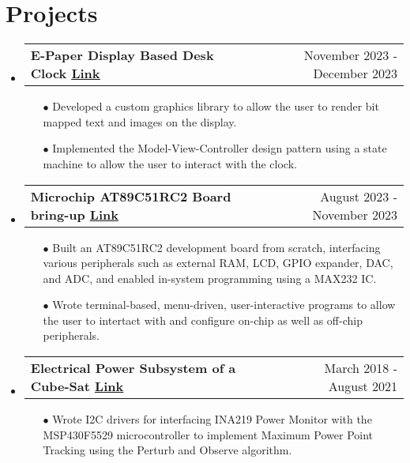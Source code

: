 \documentclass[11pt]{article}
\makeatletter
\newcommand{\resumeSubheadingP}[2]{
  \vspace{-2pt}\item
    \begin{tabular*}{1.0\textwidth}[t]{l@{\extracolsep{\fill}}r}
       \textbf{{\large #1}}&{#2} \\
    \end{tabular*}\vspace{-1pt}
}
\newcommand{\resumeSubHeadingListStart}{\begin{itemize}[leftmargin=0.0in, label={}]}
\newcommand{\resumeSubHeadingListEnd}{\end{itemize}}
\makeatother
\begin{document}
\section{Projects}
  \resumeSubHeadingListStart
    \resumeSubheadingP
    {E-Paper Display Based Desk Clock \href{https://github.com/parthkharade/Eink-DeskClock}{\small{\textbar{ }\underline{Link} }}}{November 2023 - December 2023}
    \begin{itemize}\setlength{\itemsep}{0pt}\setlength{\parskip}{0pt}\vspace{-0.2cm}
            \item[$\bullet$] Developed a custom graphics library  to allow the user to render bit mapped text and images on the display.
            \item[$\bullet$] Implemented the Model-View-Controller design pattern using a state machine to allow the user to interact with the clock.
        \end{itemize}
    \vspace{-0.3cm}
    \resumeSubheadingP
    {Microchip AT89C51RC2 Board bring-up \href{https://drive.google.com/drive/folders/1rbtfpOdMc_ohnfu15VS3bPxNDx-BoWwA?usp=drive_link}{\small{\textbar{ }\underline{Link}}}}{August 2023 - November 2023}
    \begin{itemize}\setlength{\itemsep}{0pt}\setlength{\parskip}{0pt}\vspace{-0.2cm}
            \item[$\bullet$] Built an AT89C51RC2 development board from scratch, interfacing various peripherals such as external RAM, LCD, GPIO expander, DAC, and ADC, and enabled in-system programming using a MAX232 IC.
            \item[$\bullet$] Wrote terminal-based, menu-driven, user-interactive programs to allow the user to intertact with and configure on-chip as well as off-chip peripherals.      
        \end{itemize}
    \vspace{-0.3cm}
    \resumeSubheadingP
    {Electrical Power Subsystem of a Cube-Sat \href{https://github.com/parthkharade/MSP430F5529}{\small{\textbar{ }\underline{Link} }}}{March 2018 - August 2021}
    \begin{itemize}\setlength{\itemsep}{0pt}\setlength{\parskip}{0pt}\vspace{-0.2cm}
            \item[$\bullet$] Wrote I2C drivers for interfacing INA219 Power Monitor with the MSP430F5529 microcontroller to implement Maximum Power Point Tracking using the Perturb and Observe algorithm.
        \end{itemize}
    \resumeSubHeadingListEnd
\vspace{-16pt}
\end{document}
